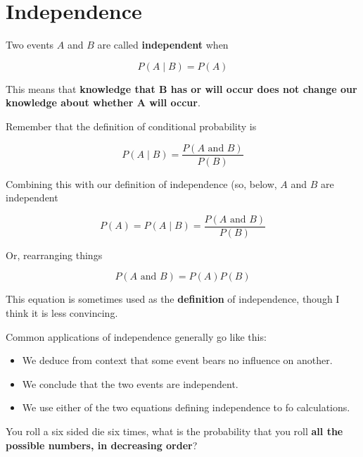 \section{Independence}

\begin{frame}

Two events $A$ and $B$ are called \textbf{independent} when

$$ P(A \mid B) = P(A) $$

This means that \textbf{knowledge that B has or will occur does not change our
knowledge about whether A will occur}.

\end{frame}
%

%
\begin{frame}

Remember that the definition of conditional probability is

$$ P(A \mid B) = \frac{P(A \text{ and } B)}{P(B)} $$

Combining this with our definition of independence (so, below, $A$ and $B$ are
independent

$$ P(A) = P(A \mid B) = \frac{P(A \text{ and } B)}{P(B)} $$

Or, rearranging things

$$ P(A \text{ and } B) = P(A) P(B) $$

This equation is sometimes used as the \textbf{definition} of independence,
though I think it is less convincing.

\end{frame}
%

%
\begin{frame}

Common applications of independence generally go like this:

\begin{itemize}
\item We deduce from context that some event bears no influence on another.
\item We conclude that the two events are independent.
\item We use either of the two equations defining independence to fo
calculations.
\end{itemize}

\end{frame}
%

%
\begin{frame}

You roll a six sided die six times, what is the probability that you roll
\textbf{all
the possible numbers, in decreasing order}?

\end{frame}
%

